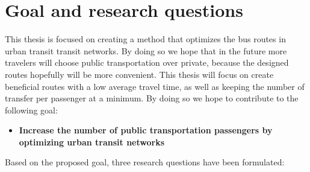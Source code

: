 \section{Goal and research questions}
This thesis is focused on creating a method that optimizes the bus routes in urban transit transit networks. By doing so we hope that in the future more travelers will choose public transportation over private, because the designed routes hopefully will be more convenient. This thesis will focus on create beneficial routes with a low average travel time, as well as keeping the number of transfer per passenger at a minimum. By doing so we hope to contribute to the following goal: 

\begin{itemize}
\item \label{itm:goal} \textbf{Increase the number of public transportation passengers by optimizing urban transit networks}
\end{itemize}

Based on the proposed goal, three research questions have been formulated: 

